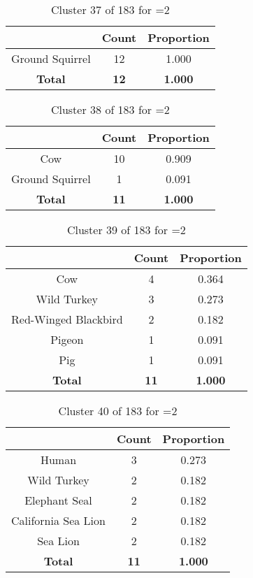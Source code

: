\begin{table}[ht!]
\centering
\begin{tabular}{|c|c|c|}
\hline
\bf \Spec{} &\bf Count &\bf Proportion\\ \hline \hline
Ground Squirrel & 12 & 1.000\\ \hline
\hline
\bf Total & \bf 12 & \bf 1.000\\ \hline
\end{tabular}
\label{tab:cluster:37:2}
\caption{Cluster 37 of 183 for \minneigh{}=2}
\end{table}

\begin{table}[ht!]
\centering
\begin{tabular}{|c|c|c|}
\hline
\bf \Spec{} &\bf Count &\bf Proportion\\ \hline \hline
Cow & 10 & 0.909\\ \hline
Ground Squirrel & 1 & 0.091\\ \hline
\hline
\bf Total & \bf 11 & \bf 1.000\\ \hline
\end{tabular}
\label{tab:cluster:38:2}
\caption{Cluster 38 of 183 for \minneigh{}=2}
\end{table}

\begin{table}[ht!]
\centering
\begin{tabular}{|c|c|c|}
\hline
\bf \Spec{} &\bf Count &\bf Proportion\\ \hline \hline
Cow & 4 & 0.364\\ \hline
Wild Turkey & 3 & 0.273\\ \hline
Red-Winged Blackbird & 2 & 0.182\\ \hline
Pigeon & 1 & 0.091\\ \hline
Pig & 1 & 0.091\\ \hline
\hline
\bf Total & \bf 11 & \bf 1.000\\ \hline
\end{tabular}
\label{tab:cluster:39:2}
\caption{Cluster 39 of 183 for \minneigh{}=2}
\end{table}

\clearpage
\begin{table}[ht!]
\centering
\begin{tabular}{|c|c|c|}
\hline
\bf \Spec{} &\bf Count &\bf Proportion\\ \hline \hline
Human & 3 & 0.273\\ \hline
Wild Turkey & 2 & 0.182\\ \hline
Elephant Seal & 2 & 0.182\\ \hline
California Sea Lion & 2 & 0.182\\ \hline
Sea Lion & 2 & 0.182\\ \hline
\hline
\bf Total & \bf 11 & \bf 1.000\\ \hline
\end{tabular}
\label{tab:cluster:40:2}
\caption{Cluster 40 of 183 for \minneigh{}=2}
\end{table}

